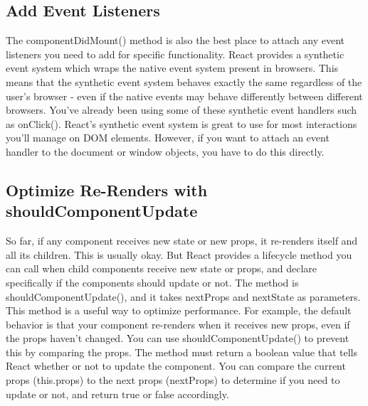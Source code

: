 \documentclass{article}%
\begin{document}
%
\subsection{Add Event Listeners}%
\label{subsec:AddEventListeners}%
The componentDidMount() method is also the best place to attach any event listeners you need to add for specific functionality. React provides a synthetic event system which wraps the native event system present in browsers. This means that the synthetic event system behaves exactly the same regardless of the user's browser {-} even if the native events may behave differently between different browsers.\newline%
You've already been using some of these synthetic event handlers such as onClick(). React's synthetic event system is great to use for most interactions you'll manage on DOM elements. However, if you want to attach an event handler to the document or window objects, you have to do this directly.\newline%

%
\subsection{Optimize Re{-}Renders with shouldComponentUpdate}%
\label{subsec:OptimizeRe{-}RenderswithshouldComponentUpdate}%
So far, if any component receives new state or new props, it re{-}renders itself and all its children. This is usually okay. But React provides a lifecycle method you can call when child components receive new state or props, and declare specifically if the components should update or not. The method is shouldComponentUpdate(), and it takes nextProps and nextState as parameters.\newline%
This method is a useful way to optimize performance. For example, the default behavior is that your component re{-}renders when it receives new props, even if the props haven't changed. You can use shouldComponentUpdate() to prevent this by comparing the props. The method must return a boolean value that tells React whether or not to update the component. You can compare the current props (this.props) to the next props (nextProps) to determine if you need to update or not, and return true or false accordingly.\newline%

%
\end{document}
